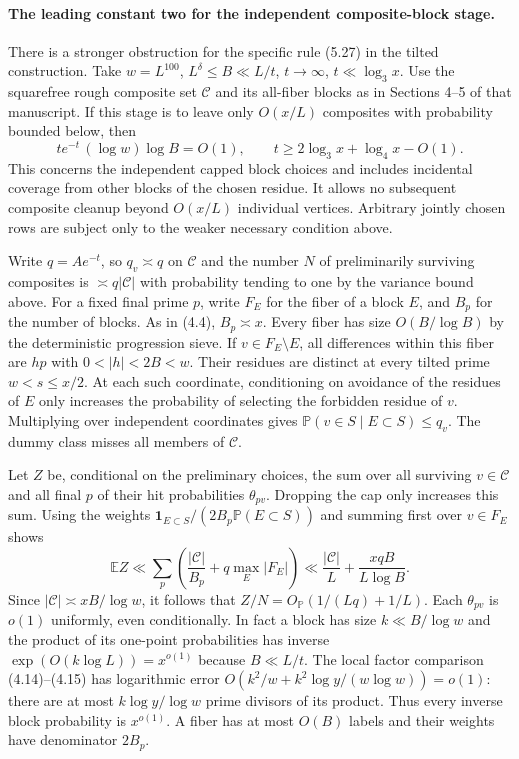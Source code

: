 \documentclass[11pt]{article}
\begin{document}
\paragraph{The leading constant two for the independent composite-block stage.}
There is a stronger obstruction for the specific rule (5.27) in the
tilted construction. Take $w=L^{100}$, $L^\delta\le B\ll L/t$,
$t\to\infty$, $t\ll\log_3 x$. Use the squarefree rough composite set
$\mathcal C$ and its all-fiber blocks as in Sections 4--5 of that
manuscript. If this stage is to leave only $O(x/L)$ composites with
probability bounded below, then
\[
  te^{-t}\,(\log w)\log B=O(1),\qquad
  t\ge 2\log_3x+\log_4x-O(1).
\]
This concerns the independent capped block choices and includes
incidental coverage from other blocks of the chosen residue.
It allows no subsequent composite cleanup beyond $O(x/L)$ individual
vertices. Arbitrary jointly chosen rows are subject only to the
weaker necessary condition above.

Write $q=Ae^{-t}$, so $q_v\asymp q$ on $\mathcal C$ and the number
$N$ of preliminarily surviving composites is $\asymp q|\mathcal C|$
with probability tending to one by the variance bound above. For a
fixed final prime $p$, write $F_E$ for the fiber of a block $E$,
and $B_p$ for the number of blocks. As in (4.4), $B_p\asymp x$.
Every fiber has size $O(B/\log B)$ by the deterministic progression
sieve. If $v\in F_E\setminus E$, all differences within this fiber
are $hp$ with $0<|h|<2B<w$. Their residues are distinct at every
tilted prime $w<s\le x/2$. At each such coordinate, conditioning
on avoidance of the residues of $E$ only increases the probability
of selecting the forbidden residue of $v$. Multiplying over
independent coordinates gives
$\mathbb P(v\in S\mid E\subset S)\le q_v$.
The dummy class misses all members of $\mathcal C$.

Let $Z$ be, conditional on the preliminary choices, the sum over all
surviving $v\in\mathcal C$ and all final $p$ of their hit probabilities
$\theta_{pv}$. Dropping the cap only increases this sum. Using
the weights $\mathbf1_{E\subset S}/(2B_p\mathbb P(E\subset S))$
and summing first over $v\in F_E$ shows
\[
 \mathbb E Z
 \ll \sum_p\left(\frac{|\mathcal C|}{B_p}
                       +q\max_E |F_E|\right)
 \ll \frac{|\mathcal C|}{L}+\frac{xqB}{L\log B}.
\]
Since $|\mathcal C|\asymp xB/\log w$, it follows that
$Z/N=O_{\mathbb P}(1/(Lq)+1/L)$.
Each $\theta_{pv}$ is $o(1)$ uniformly, even conditionally.
In fact a block has size $k\ll B/\log w$ and the product of its
one-point probabilities has inverse $\exp(O(k\log L))=x^{o(1)}$
because $B\ll L/t$. The local factor comparison (4.14)--(4.15)
has logarithmic error $O(k^2/w+k^2\log y/(w\log w))=o(1)$:
there are at most $k\log y/\log w$ prime divisors of its product.
Thus every inverse block probability is $x^{o(1)}$. A fiber has
at most $O(B)$ labels and their weights have denominator $2B_p$.
\end{document}
